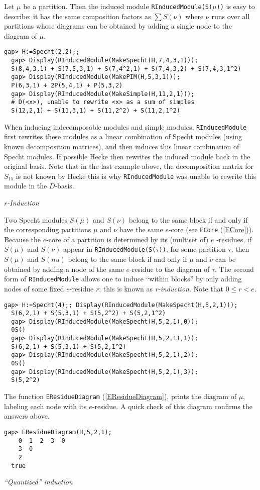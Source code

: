 \documentclass[a4paper,11pt]{report}
\begin{document}
{{{ Let $\mu$ be a partition. Then the induced module \texttt{RInducedModule(S(}$\mu$\texttt{))} is easy to describe: it has the same composition factors as $\sum S(\nu)$ where $\nu$ runs over all partitions whose diagrams can be obtained by adding a single
node to the diagram of $\mu$. 
\begin{Verbatim}[fontsize=\small,frame=single,label=Example]
  gap> H:=Specht(2,2);;
  gap> Display(RInducedModule(MakeSpecht(H,7,4,3,1)));
  S(8,4,3,1) + S(7,5,3,1) + S(7,4^2,1) + S(7,4,3,2) + S(7,4,3,1^2)
  gap> Display(RInducedModule(MakePIM(H,5,3,1)));
  P(6,3,1) + 2P(5,4,1) + P(5,3,2)
  gap> Display(RInducedModule(MakeSimple(H,11,2,1)));
  # D(<x>), unable to rewrite <x> as a sum of simples
  S(12,2,1) + S(11,3,1) + S(11,2^2) + S(11,2,1^2)
\end{Verbatim}
 When inducing indecomposable modules and simple modules, \texttt{RInducedModule} first rewrites these modules as a linear combination of Specht modules (using
known decomposition matrices), and then induces this linear combination of
Specht modules. If possible \textsf{Hecke} then rewrites the induced module back in the original basis. Note that in the
last example above, the decomposition matrix for $S_{15}$ is not known by \textsf{Hecke} this is why \texttt{RInducedModule} was unable to rewrite this module in the $D$-basis.

 \emph{$r$-Induction}

 Two Specht modules $S(\mu)$ and $S(\nu)$ belong to the same block if and only if the corresponding partitions $\mu$ and $\nu$ have the same $e$-core \cite{JM2} (see \texttt{ECore} (\ref{ECore})). Because the $e$-core of a partition is determined by its (multiset of) $e$ -residues, if $S(\mu)$ and $S(\nu)$ appear in \texttt{RInducedModule(S(}$\tau$\texttt{))}, for some partition $\tau$, then $S(\mu)$ and $S(nu)$ belong to the same block if and only if $\mu$ and $\nu$ can be obtained by adding a node of the same $e$-residue to the diagram of $\tau$. The second form of \texttt{RInducedModule} allows one to induce ``within blocks'' by only adding nodes of some fixed $e$-residue $r$; this is known as \emph{r-induction}. Note that $0\leq r<e$.

 
\begin{Verbatim}[fontsize=\small,frame=single,label=Example]
  gap> H:=Specht(4);; Display(RInducedModule(MakeSpecht(H,5,2,1)));
  S(6,2,1) + S(5,3,1) + S(5,2^2) + S(5,2,1^2)
  gap> Display(RInducedModule(MakeSpecht(H,5,2,1),0));
  0S()
  gap> Display(RInducedModule(MakeSpecht(H,5,2,1),1));
  S(6,2,1) + S(5,3,1) + S(5,2,1^2)
  gap> Display(RInducedModule(MakeSpecht(H,5,2,1),2));
  0S()
  gap> Display(RInducedModule(MakeSpecht(H,5,2,1),3));
  S(5,2^2)
\end{Verbatim}
 The function \texttt{EResidueDiagram} (\ref{EResidueDiagram}), prints the diagram of $\mu$, labeling each node with its $e$-residue. A quick check of this diagram confirms the answers above. 
\begin{Verbatim}[fontsize=\small,frame=single,label=Example]
  gap> EResidueDiagram(H,5,2,1);
    0  1  2  3  0
    3  0
    2
  true
\end{Verbatim}
 \emph{``Quantized'' induction}

}}}
\end{document}
